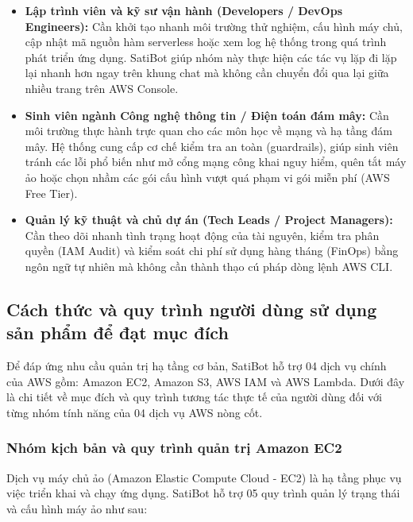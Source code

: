 \documentclass[a4paper,12pt]{article}
\begin{document}
\begin{itemize}
  \item \textbf{Lập trình viên và kỹ sư vận hành (Developers / DevOps Engineers):} Cần khởi tạo nhanh môi trường thử nghiệm, cấu hình máy chủ, cập nhật mã nguồn hàm serverless hoặc xem log hệ thống trong quá trình phát triển ứng dụng. SatiBot giúp nhóm này thực hiện các tác vụ lặp đi lặp lại nhanh hơn ngay trên khung chat mà không cần chuyển đổi qua lại giữa nhiều trang trên AWS Console.
  \item \textbf{Sinh viên ngành Công nghệ thông tin / Điện toán đám mây:} Cần môi trường thực hành trực quan cho các môn học về mạng và hạ tầng đám mây. Hệ thống cung cấp cơ chế kiểm tra an toàn (guardrails), giúp sinh viên tránh các lỗi phổ biến như mở cổng mạng công khai nguy hiểm, quên tắt máy ảo hoặc chọn nhầm các gói cấu hình vượt quá phạm vi gói miễn phí (AWS Free Tier).
  \item \textbf{Quản lý kỹ thuật và chủ dự án (Tech Leads / Project Managers):} Cần theo dõi nhanh tình trạng hoạt động của tài nguyên, kiểm tra phân quyền (IAM Audit) và kiểm soát chi phí sử dụng hàng tháng (FinOps) bằng ngôn ngữ tự nhiên mà không cần thành thạo cú pháp dòng lệnh AWS CLI.
\end{itemize}

\subsection{Cách thức và quy trình người dùng sử dụng sản phẩm để đạt mục đích}

\begingroup
{}
\setlength{\parskip}{2pt}

Để đáp ứng nhu cầu quản trị hạ tầng cơ bản, SatiBot hỗ trợ 04 dịch vụ chính của AWS gồm: Amazon EC2, Amazon S3, AWS IAM và AWS Lambda. Dưới đây là chi tiết về mục đích và quy trình tương tác thực tế của người dùng đối với từng nhóm tính năng của 04 dịch vụ AWS nòng cốt.

\subsubsection{Nhóm kịch bản và quy trình quản trị Amazon EC2}

Dịch vụ máy chủ ảo (Amazon Elastic Compute Cloud - EC2) là hạ tầng phục vụ việc triển khai và chạy ứng dụng. SatiBot hỗ trợ 05 quy trình quản lý trạng thái và cấu hình máy ảo như sau:
\end{document}
